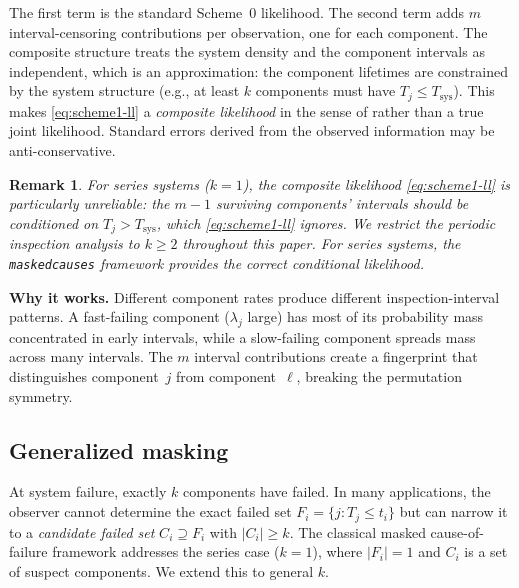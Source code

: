 \documentclass[12pt]{article}
\newtheorem{remark}{Remark}
\newcommand{\Tsys}{T_{\mathrm{sys}}}
\begin{document}
The first term is the standard Scheme~0 likelihood.  The second term adds
$m$ interval-censoring contributions per observation, one for each component.
The composite structure treats the system density and the component intervals
as independent, which is an approximation: the component lifetimes are
constrained by the system structure (e.g., at least $k$ components must have
$T_j \leq \Tsys$).  This makes \eqref{eq:scheme1-ll} a
\emph{composite likelihood} in the sense of \citet{VarinReidFirth2011} rather
than a true joint likelihood.  Standard errors derived from the observed
information may be anti-conservative.

\begin{remark}\label{rem:series-breakdown}
For series systems ($k = 1$), the composite likelihood
\eqref{eq:scheme1-ll} is particularly unreliable: the $m - 1$ surviving
components' intervals should be conditioned on $T_j > \Tsys$, which
\eqref{eq:scheme1-ll} ignores.  We restrict the periodic inspection
analysis to $k \geq 2$ throughout this paper.  For series systems, the
\texttt{maskedcauses} framework \citep{LinUsherGuess1993} provides the
correct conditional likelihood.
\end{remark}

\textbf{Why it works.}
Different component rates produce different inspection-interval patterns.
A fast-failing component ($\lambda_j$ large) has most of its probability
mass concentrated in early intervals, while a slow-failing component
spreads mass across many intervals.  The $m$ interval contributions create
a fingerprint that distinguishes component~$j$ from component~$\ell$,
breaking the permutation symmetry.

\subsection{Generalized masking}\label{sec:masking}

At system failure, exactly $k$ components have failed.  In many
applications, the observer cannot determine the exact failed set
$F_i = \{j : T_j \leq t_i\}$ but can narrow it to a \emph{candidate
failed set} $C_i \supseteq F_i$ with $|C_i| \geq k$.  The classical
masked cause-of-failure framework \citep{Miyakawa1984, LinUsherGuess1993}
addresses the series case ($k = 1$), where $|F_i| = 1$ and $C_i$ is a
set of suspect components.  We extend this to general $k$.
\end{document}
